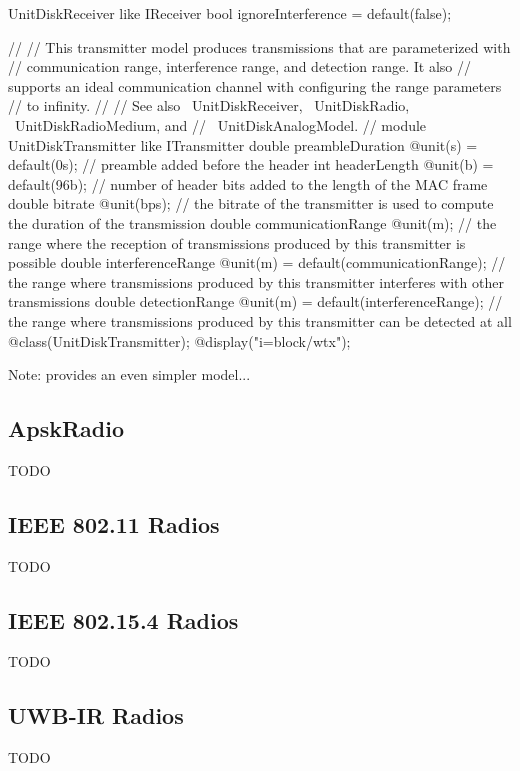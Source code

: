 UnitDiskReceiver like IReceiver
        bool ignoreInterference = default(false);


//
// This transmitter model produces transmissions that are parameterized with
// communication range, interference range, and detection range. It also
// supports an ideal communication channel with configuring the range parameters
// to infinity.
//
// See also ~UnitDiskReceiver, ~UnitDiskRadio, ~UnitDiskRadioMedium, and
// ~UnitDiskAnalogModel.
//
module UnitDiskTransmitter like ITransmitter
        double preambleDuration @unit(s) = default(0s);                  // preamble added before the header
        int headerLength @unit(b) = default(96b);                     // number of header bits added to the length of the MAC frame
        double bitrate @unit(bps);                                       // the bitrate of the transmitter is used to compute the duration of the transmission
        double communicationRange @unit(m);                              // the range where the reception of transmissions produced by this transmitter is possible
        double interferenceRange @unit(m) = default(communicationRange); // the range where transmissions produced by this transmitter interferes with other transmissions
        double detectionRange @unit(m) = default(interferenceRange);     // the range where transmissions produced by this transmitter can be detected at all
        @class(UnitDiskTransmitter);
        @display("i=block/wtx");

Note:  provides an even simpler model...

\subsection{ApskRadio}

TODO

\subsection{IEEE 802.11 Radios}

TODO

\subsection{IEEE 802.15.4 Radios}

TODO

\subsection{UWB-IR Radios}

TODO



